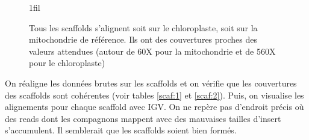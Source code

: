 \documentclass[a4paper]{article}
\makeatletter
\newcommand*{\centerfloat}{%
  \parindent \z@
  \leftskip \z@ \@plus 1fil \@minus \textwidth
  \rightskip\leftskip
  \parfillskip \z@skip}
\makeatother
\begin{document}
\begin{figure}[!ht]
\centerfloat

 \hspace{5mm}

\label{scaf}
\caption{Tous les scaffolds s'alignent soit sur le chloroplaste, soit sur la mitochondrie de référence. Ils ont des couvertures proches des valeurs attendues (autour de 60X pour la mitochondrie et de 560X pour le chloroplaste)}
\end{figure}

On réaligne les données brutes sur les scaffolds et on vérifie que les couvertures des scaffolds sont cohérentes (voir tables \ref{scaf:1} et \ref{scaf:2}). Puis, on visualise les alignements pour chaque scaffold avec IGV. On ne repère pas d'endroit précis où des reads dont les compagnons mappent avec des mauvaises tailles d'insert s'accumulent. Il semblerait que les scaffolds soient bien formés. 

\end{document}
